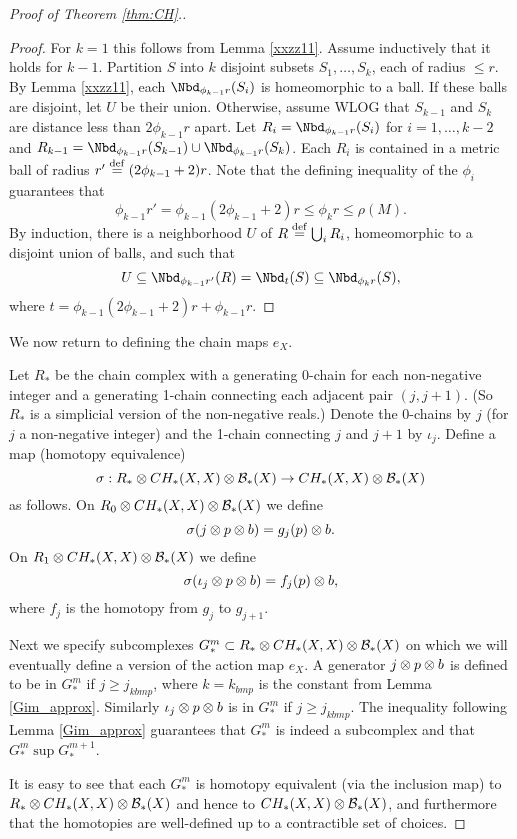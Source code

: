 {\begin{proof}[Proof of Theorem \ref{thm:CH}.]
\begin{proof}
For $k=1$ this follows from Lemma \ref{xxzz11}.
Assume inductively that it holds for $k-1$.
Partition $S$ into $k$ disjoint subsets $S_1,\ldots,S_k$, each of radius $\le r$.
By Lemma \ref{xxzz11}, each $\Nbd_{\phi_{k-1} r}(S_i)$ is homeomorphic to a ball.
If these balls are disjoint, let $U$ be their union.
Otherwise, assume WLOG that $S_{k-1}$ and $S_k$ are distance less than $2\phi_{k-1}r$ apart.
Let $R_i = \Nbd_{\phi_{k-1} r}(S_i)$ for $i = 1,\ldots,k-2$ 
and $R_{k-1} = \Nbd_{\phi_{k-1} r}(S_{k-1})\cup \Nbd_{\phi_{k-1} r}(S_k)$.
Each $R_i$ is contained in a metric ball of radius $r' \stackrel{\mathrm{def}}{=} (2\phi_{k-1}+2)r$.
Note that the defining inequality of the $\phi_i$ guarantees that
\[
	\phi_{k-1}r' = \phi_{k-1}(2\phi_{k-1}+2)r \le \phi_k r \le \rho(M) .
\]
By induction, there is a neighborhood $U$ of $R \stackrel{\mathrm{def}}{=} \bigcup_i R_i$, 
homeomorphic to a disjoint union
of balls, and such that
\[
	U \subeq \Nbd_{\phi_{k-1}r'}(R) = \Nbd_{t}(S) \subeq \Nbd_{\phi_k r}(S) ,
\]
where $t = \phi_{k-1}(2\phi_{k-1}+2)r + \phi_{k-1} r$.
\end{proof}


We now return to defining the chain maps $e_X$.


Let $R_*$ be the chain complex with a generating 0-chain for each non-negative
integer and a generating 1-chain connecting each adjacent pair $(j, j+1)$.
(So $R_*$ is a simplicial version of the non-negative reals.)
Denote the 0-chains by $j$ (for $j$ a non-negative integer) and the 1-chain connecting $j$ and $j+1$
by $\iota_j$.
Define a map (homotopy equivalence)
\[
	\sigma: R_*\otimes CH_*(X, X) \otimes {\mathcal B}_*(X) \to CH_*(X, X)\otimes {\mathcal B}_*(X)
\]
as follows.
On $R_0\otimes CH_*(X, X) \otimes {\mathcal B}_*(X)$ we define
\[
	\sigma(j\otimes p\otimes b) = g_j(p)\otimes b .
\]
On $R_1\otimes CH_*(X, X) \otimes {\mathcal B}_*(X)$ we define
\[
	\sigma(\iota_j\otimes p\otimes b) = f_j(p)\otimes b ,
\]
where $f_j$ is the homotopy from $g_j$ to $g_{j+1}$.

Next we specify subcomplexes $G^m_* \subset R_*\otimes CH_*(X, X) \otimes {\mathcal B}_*(X)$ on which we will eventually
define a version of the action map $e_X$.
A generator $j\otimes p\otimes b$ is defined to be in $G^m_*$ if $j\ge j_{kbmp}$, where
$k = k_{bmp}$ is the constant from Lemma \ref{Gim_approx}.
Similarly $\iota_j\otimes p\otimes b$ is in $G^m_*$ if $j\ge j_{kbmp}$.
The inequality following Lemma \ref{Gim_approx} guarantees that $G^m_*$ is indeed a subcomplex
and that $G^m_* \sup G^{m+1}_*$.

It is easy to see that each $G^m_*$ is homotopy equivalent (via the inclusion map) 
to $R_*\otimes CH_*(X, X) \otimes {\mathcal B}_*(X)$
and hence to $CH_*(X, X) \otimes {\mathcal B}_*(X)$, and furthermore that the homotopies are well-defined
up to a contractible set of choices.


\end{proof}}
